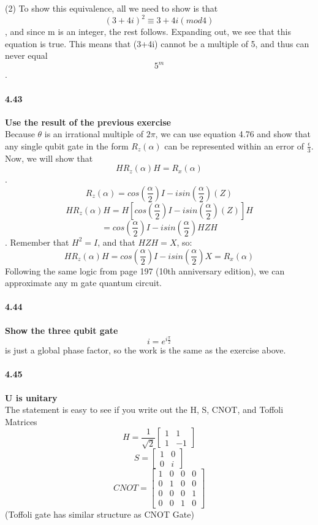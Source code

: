 (2) To show this equivalence, all we need to show is that $$(3+4i)^2 \equiv 3+4i (mod 4)$$, and since m is an integer, the rest follows. Expanding out, we see that this equation is true. This means that (3+4i) cannot be a multiple of 5, and thus can never equal $$5^m$$.


\paragraph{4.43} \textbf{Use the result of the previous exercise}
\\
Because $\theta$ is an irrational multiple of $2\pi$, we can use equation 4.76 and show that any single qubit gate in the form $R_z(\alpha)$ can be represented within an error of $\frac{\epsilon}{3}$. Now, we will show that $$HR_z(\alpha)H = R_x(\alpha)$$.
$$R_z(\alpha) = cos(\frac{\alpha}{2})I - isin(\frac{\alpha}{2})(Z)$$
$$HR_z(\alpha)H = H \left[ cos(\frac{\alpha}{2})I - isin(\frac{\alpha}{2})(Z) \right] H$$
$$= cos(\frac{\alpha}{2})I -isin(\frac{\alpha}{2}) HZH$$.
Remember that $H^2 = I$, and that $HZH = X$, so:
$$HR_z(\alpha)H =  cos(\frac{\alpha}{2})I -isin(\frac{\alpha}{2})X = R_x(\alpha)$$
Following the same logic from page 197 (10th anniversary edition), we can approximate any m gate quantum circuit. 

\paragraph{4.44} \textbf{Show the three qubit gate}
\\

$$i = e^{i\frac{\pi}{2}}$$ is just a global phase factor, so the work is the same as the exercise above.

\paragraph{4.45} \textbf{U is unitary}
\\

The statement is easy to see if you write out the H, S, CNOT, and Toffoli Matrices
$$H = \frac{1}{\sqrt{2}} \begin{bmatrix}1 & 1\\
1 & -1\end{bmatrix}$$
$$S = \begin{bmatrix}1 & 0\\0 & i\end{bmatrix}$$
$$CNOT = \begin{bmatrix}1 & 0 & 0 & 0\\0 & 1 & 0 & 0 \\
0 & 0 & 0 & 1 \\
0 & 0 & 1 & 0\end{bmatrix}$$
(Toffoli gate has similar structure as CNOT Gate)


